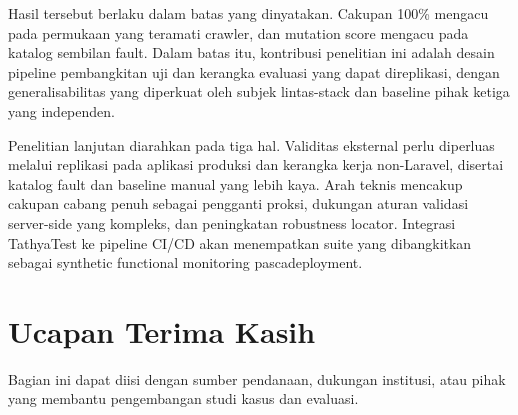 \documentclass[conference]{IEEEtran}
\begin{document}
Hasil tersebut berlaku dalam batas yang dinyatakan. Cakupan 100\% mengacu pada permukaan yang teramati crawler, dan mutation score mengacu pada katalog sembilan fault. Dalam batas itu, kontribusi penelitian ini adalah desain pipeline pembangkitan uji dan kerangka evaluasi yang dapat direplikasi, dengan generalisabilitas yang diperkuat oleh subjek lintas-stack dan baseline pihak ketiga yang independen.

Penelitian lanjutan diarahkan pada tiga hal. Validitas eksternal perlu diperluas melalui replikasi pada aplikasi produksi dan kerangka kerja non-Laravel, disertai katalog fault dan baseline manual yang lebih kaya. Arah teknis mencakup cakupan cabang penuh sebagai pengganti proksi, dukungan aturan validasi server-side yang kompleks, dan peningkatan robustness locator. Integrasi TathyaTest ke pipeline CI/CD akan menempatkan suite yang dibangkitkan sebagai synthetic functional monitoring pascadeployment.

\section*{Ucapan Terima Kasih}

Bagian ini dapat diisi dengan sumber pendanaan, dukungan institusi, atau pihak yang membantu pengembangan studi kasus dan evaluasi.



\end{document}
